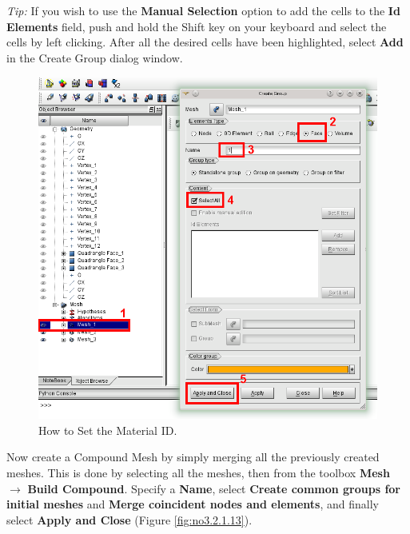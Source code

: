 \textit{Tip:} If you wish to use the \textbf{Manual Selection} option to add the cells to the \textbf{Id Elements} field, push and hold the Shift key on your keyboard and select the cells by left clicking. After all the desired cells have been highlighted, select \textbf{Add} in the Create Group dialog window.

\begin{figure}[h!]
\begin{center}
\includegraphics[scale=0.50]{figures/SalomeStep4.png}
\caption{How to Set the Material ID.}
\label{fig:no3.2.1.12}
\end{center}
\end{figure}

Now create a Compound Mesh by simply merging all the previously created meshes. This is done by selecting all the meshes, then from the toolbox \textbf{Mesh} $\rightarrow$ \textbf{Build Compound}. Specify a \textbf{Name}, select \textbf{Create common groups for initial meshes} and \textbf{Merge coincident nodes and elements}, and finally select \textbf{Apply and Close} (Figure \ref{fig:no3.2.1.13}).
        
